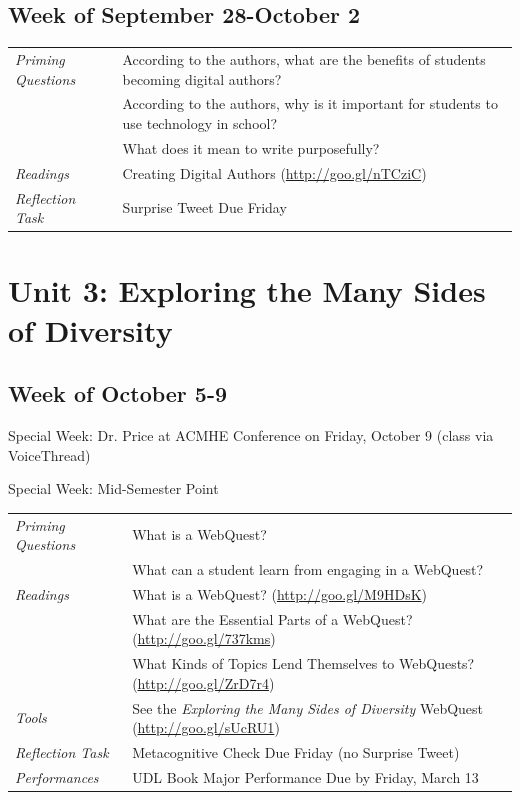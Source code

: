 \documentclass{tufte-handout}
\newcommand{\tabpq}{\faQuestionSign\medspace\textit{Priming Questions}}
\newcommand{\tabread}{\faBook\medspace\textit{Readings}}
\newcommand{\tabtools}{\faWrench\medspace\textit{Tools}}
\newcommand{\tabtweet}{\faLightbulb\medspace\textit{Reflection Task} & Surprise Tweet Due Friday \\}
\newcommand{\tabcheck}{\faLightbulb\medspace\textit{Reflection Task} & Metacognitive Check Due Friday (no Surprise Tweet) \\}
\newcommand{\tabperformance}{\faTasks\medspace\textit{Performances}}
\newenvironment{tabsched}
	{\small
	\begin{tabular}{p{1.5in}p{5in}}
	\toprule}
	{\bottomrule
	\end{tabular}
	\normalsize}
\newenvironment{specweek}
	{\begin{center}
		\fontseries{b} \faBullhorn \medspace Special Week: }
		{\medspace \faBullhorn \fontseries{m}
	\end{center}}
\newcommand{\weekseven}{September 28-October 2}
\newcommand{\weekeight}{October 5-9}
\newcommand{\midsemester}{Mid-Semester Point}
\newcommand{\acmhe}{Dr. Price at ACMHE Conference on Friday, October 9 (class via VoiceThread)}
\begin{document}
\begin{fullwidth}
\subsection{Week of \weekseven}

\begin{tabsched}
	\tabpq & According to the authors, what are the benefits of students becoming digital authors? \\
	& According to the authors, why is it important for students to use technology in school? \\
	& What does it mean to write purposefully? \\
	\midrule
	\tabread & Creating Digital Authors (\url{http://goo.gl/nTCziC}) \\
	\midrule
	\tabtweet
\end{tabsched}

\section{Unit 3: Exploring the Many Sides of Diversity}

\subsection{Week of \weekeight}

\begin{specweek}\acmhe\end{specweek}
\begin{specweek}\midsemester\end{specweek}

\begin{tabsched}
	\tabpq & What is a WebQuest? \\
	& What can a student learn from engaging in a WebQuest? \\
	\midrule
	\tabread &  What is a WebQuest? (\url{http://goo.gl/M9HDsK}) \\
	& What are the Essential Parts of a WebQuest? (\url{http://goo.gl/737kms}) \\
	& What Kinds of Topics Lend Themselves to WebQuests? (\url{http://goo.gl/ZrD7r4}) \\
	\midrule
	\tabtools & See the \textit{Exploring the Many Sides of Diversity} WebQuest (\url{http://goo.gl/sUcRU1}) \\
	\midrule
	\tabcheck
	\midrule
	\tabperformance & UDL Book Major Performance Due by Friday, March 13 \\
\end{tabsched}


\end{fullwidth}
\end{document}
